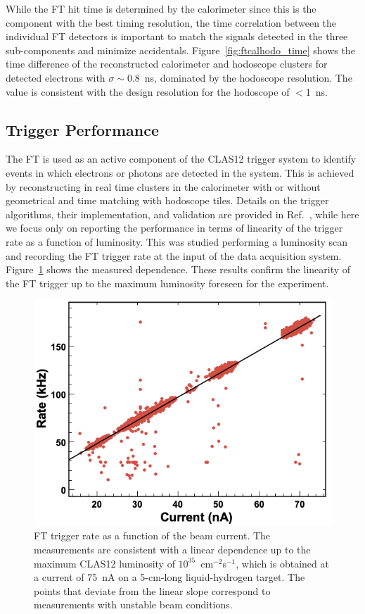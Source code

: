 While the FT hit time is determined by the calorimeter since this is the component with the best timing resolution,
the time correlation between the individual FT detectors is important to match the signals detected in the three
sub-components and minimize accidentals. Figure~\ref{fig:ftcalhodo_time} shows the time difference of the
reconstructed calorimeter and hodoscope clusters for detected electrons with $\sigma \sim$0.8~ns,
dominated by the hodoscope resolution. The value is consistent with the design resolution for the hodoscope of
$<$1~ns.

\subsection{Trigger Performance}

The FT is used as an active component of the CLAS12 trigger system to identify events in which electrons or
photons are detected in the system. This is achieved by reconstructing in real time clusters in the calorimeter with
or without geometrical and time matching with hodoscope tiles. Details on the trigger algorithms, their implementation,
and validation are provided in Ref.~\cite{trigger}, while here we focus only on reporting the performance in terms of
linearity of the trigger rate as a function of luminosity. This was studied performing a luminosity scan and recording
the FT trigger rate at the input of the data acquisition system. Figure~\ref{fig:trigger_rate} shows the measured
dependence. These results confirm the linearity of the FT trigger up to the maximum luminosity foreseen for the
experiment.

\begin{figure}[h]
\includegraphics[height=0.68\columnwidth]{fig/ft_trigger.png}
\caption{FT trigger rate as a function of the beam current. The measurements are consistent with a linear dependence
  up to the maximum CLAS12 luminosity of $10^{35}$~cm$^{-2}$s$^{-1}$, which is obtained at a current of 75~nA on a
  5-cm-long liquid-hydrogen target. The points that deviate from the linear slope correspond to measurements with
  unstable beam conditions.}
\label{fig:trigger_rate}
\end{figure}

